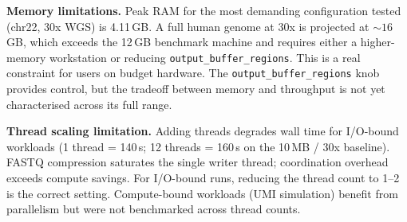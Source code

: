\textbf{Memory limitations.}
Peak RAM for the most demanding configuration tested (chr22, 30x WGS) is 4.11\,GB.
A full human genome at 30x is projected at ${\sim}16$\,GB, which exceeds the 12\,GB benchmark machine and requires either a higher-memory workstation or reducing \texttt{output\_buffer\_regions}.
This is a real constraint for users on budget hardware.
The \texttt{output\_buffer\_regions} knob provides control, but the tradeoff between memory and throughput is not yet characterised across its full range.

\textbf{Thread scaling limitation.}
Adding threads degrades wall time for I/O-bound workloads (1 thread = 140\,s; 12 threads = 160\,s on the 10\,MB / 30x baseline).
FASTQ compression saturates the single writer thread; coordination overhead exceeds compute savings.
For I/O-bound runs, reducing the thread count to 1--2 is the correct setting.
Compute-bound workloads (UMI simulation) benefit from parallelism but were not benchmarked across thread counts.
